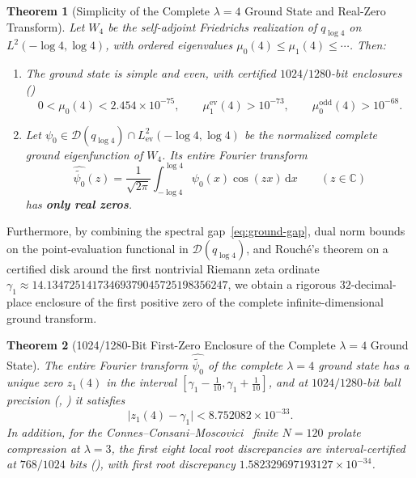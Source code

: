 \documentclass[11pt]{article}
\newtheorem{theorem}{Theorem}[section]
\theoremstyle{remark}
\newcommand{\dd}{\mathrm d}
\begin{document}
\begin{theorem}[Simplicity of the Complete $\lambda = 4$ Ground State and Real-Zero Transform]
\label{thm:lambda4-ground}
Let $W_4$ be the self-adjoint Friedrichs realization of $q_{\log 4}$ on $L^2(-\log 4, \log 4)$, with ordered eigenvalues $\mu_0(4) \le \mu_1(4) \le \cdots$. Then:
\begin{enumerate}[label=(\roman*)]
  \item The ground state is simple and even, with certified $1024/1280$-bit enclosures ()
  \begin{equation}\label{eq:ground-gap}
    0 < \mu_0(4) < 2.454 \times 10^{-75}, \qquad \mu_1^{\mathrm{ev}}(4) > 10^{-73}, \qquad \mu_0^{\mathrm{odd}}(4) > 10^{-68}.
  \end{equation}
  \item Let $\psi_0 \in \mathcal{D}(q_{\log 4}) \cap L^2_{\mathrm{ev}}(-\log 4, \log 4)$ be the normalized complete ground eigenfunction of $W_4$. Its entire Fourier transform
  \begin{equation}
    \widehat{\widetilde{\psi_0}}(z) = \frac{1}{\sqrt{2\pi}}\int_{-\log 4}^{\log 4} \psi_0(x)\cos(zx)\,\dd x \qquad (z \in \mathbb{C})
  \end{equation}
  has \textbf{only real zeros}.
\end{enumerate}
\end{theorem}

Furthermore, by combining the spectral gap~\eqref{eq:ground-gap}, dual norm bounds on the point-evaluation functional in $\mathcal{D}(q_{\log 4})$, and Rouch\'e's theorem on a certified disk around the first nontrivial Riemann zeta ordinate $\gamma_1 \approx 14.13472514173469379045725198356247$, we obtain a rigorous $32$-decimal-place enclosure of the first positive zero of the complete infinite-dimensional ground transform.

\begin{theorem}[1024/1280-Bit First-Zero Enclosure of the Complete $\lambda = 4$ Ground State]
\label{thm:first-zero-enclosure}
The entire Fourier transform $\widehat{\widetilde{\psi_0}}$ of the complete $\lambda = 4$ ground state has a unique zero $z_1(4)$ in the interval $[\gamma_1 - \tfrac{1}{10}, \gamma_1 + \tfrac{1}{10}]$, and at $1024/1280$-bit ball precision (, ) it satisfies
\begin{equation}\label{eq:first-zero-bound}
  \bigl|z_1(4) - \gamma_1\bigr| < 8.752082 \times 10^{-33}.
\end{equation}
In addition, for the Connes--Consani--Moscovici~\cite{ConnesConsaniMoscovici2025} finite $N = 120$ prolate compression at $\lambda = 3$, the first eight local root discrepancies are interval-certified at $768/1024$ bits (), with first root discrepancy $1.582329697193127 \times 10^{-34}$.
\end{theorem}
\end{document}
